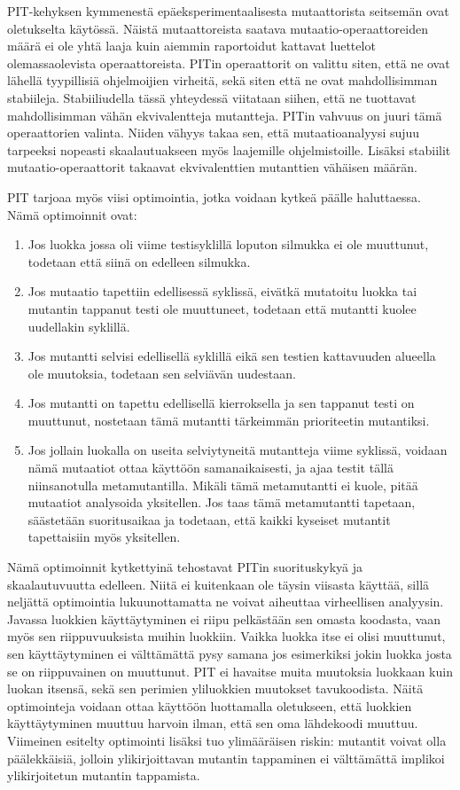 \documentclass{tktltiki}
\begin{document}
PIT-kehyksen kymmenestä epäeksperimentaalisesta mutaattorista seitsemän ovat oletukselta käytössä. Näistä mutaattoreista saatava mutaatio-operaattoreiden määrä ei ole yhtä laaja kuin aiemmin raportoidut kattavat luettelot olemassaolevista operaattoreista. PITin operaattorit on valittu siten, että ne ovat lähellä tyypillisiä ohjelmoijien virheitä, sekä siten että ne ovat mahdollisimman stabiileja. Stabiiliudella tässä yhteydessä viitataan siihen, että ne tuottavat mahdollisimman vähän ekvivalentteja mutantteja. PITin vahvuus on juuri tämä operaattorien valinta. Niiden vähyys takaa sen, että mutaatioanalyysi sujuu tarpeeksi nopeasti skaalautuakseen myös laajemille ohjelmistoille. Lisäksi stabiilit mutaatio-operaattorit takaavat ekvivalenttien mutanttien vähäisen määrän.

PIT tarjoaa myös viisi optimointia, jotka voidaan kytkeä päälle haluttaessa. Nämä optimoinnit ovat:
\begin{enumerate}
	\item Jos luokka jossa oli viime testisyklillä loputon silmukka ei ole muuttunut, todetaan että siinä on edelleen silmukka.
	\item Jos mutaatio tapettiin edellisessä syklissä, eivätkä mutatoitu luokka tai mutantin tappanut testi ole muuttuneet, todetaan että mutantti kuolee uudellakin syklillä.
	\item Jos mutantti selvisi edellisellä syklillä eikä sen testien kattavuuden alueella ole muutoksia, todetaan sen selviävän uudestaan. 
	\item Jos mutantti on tapettu edellisellä kierroksella ja sen tappanut testi on muuttunut, nostetaan tämä mutantti tärkeimmän prioriteetin mutantiksi.
	\item Jos jollain luokalla on useita selviytyneitä mutantteja viime syklissä, voidaan nämä mutaatiot ottaa käyttöön samanaikaisesti, ja ajaa testit tällä niinsanotulla metamutantilla. Mikäli tämä metamutantti ei kuole, pitää mutaatiot analysoida yksitellen. Jos taas tämä metamutantti tapetaan, säästetään suoritusaikaa ja todetaan, että kaikki kyseiset mutantit tapettaisiin myös yksitellen.
\end{enumerate}
Nämä optimoinnit kytkettyinä tehostavat PITin suorituskykyä ja skaalautuvuutta edelleen. Niitä ei kuitenkaan ole täysin viisasta käyttää, sillä neljättä optimointia lukuunottamatta ne voivat aiheuttaa virheellisen analyysin. Javassa luokkien käyttäytyminen ei riipu pelkästään sen omasta koodasta, vaan myös sen riippuvuuksista muihin luokkiin. Vaikka luokka itse ei olisi muuttunut, sen käyttäytyminen ei välttämättä pysy samana jos esimerkiksi jokin luokka josta se on riippuvainen on muuttunut. PIT ei havaitse muita muutoksia luokkaan kuin luokan itsensä, sekä sen perimien yliluokkien muutokset tavukoodista. Näitä optimointeja voidaan ottaa käyttöön luottamalla oletukseen, että luokkien käyttäytyminen muuttuu harvoin ilman, että sen oma lähdekoodi muuttuu. Viimeinen esitelty optimointi lisäksi tuo ylimääräisen riskin: mutantit voivat olla päälekkäisiä, jolloin ylikirjoittavan mutantin tappaminen ei välttämättä implikoi ylikirjoitetun mutantin tappamista.
\end{document}
